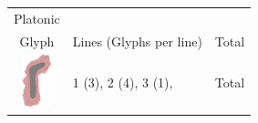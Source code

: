 \documentclass[final]{report}
\begin{document}

\begin{center}
\begin{table}
\begin{tabular}{|c|p{15.59cm}|r}
Platonic\\Glyph & {Lines (Glyphs per line)} & {Total} \\
\hline
\includegraphics[align=t,width=0.8cm]{0001} & 1 (3), 2 (4), 3 (1), & Total \\

\hline
\end{tabular}
\end{table}
\end{center}
\end{document}
